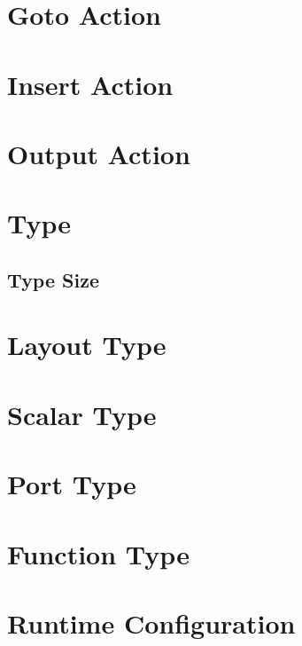 \section{Goto Action} \label{goto_guide}

\section{Insert Action} \label{insert_guide}

\section{Output Action} \label{output_guide}

\section{Type} \label{type_guide}

\subsection{Type Size} \label{type_size}

\section{Layout Type} \label{layout_type_guide}

\section{Scalar Type} \label{scalar_type_guide}

\section{Port Type} \label{port_type_guide}

\section{Function Type} \label{function_type_guide}

\section{Runtime Configuration} \label{config_guide}
